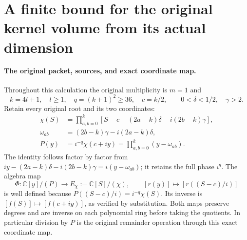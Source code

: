 \documentclass[11pt,a4paper]{article}
\begin{document}

\clearpage
\section{A finite bound for the original kernel volume from its actual dimension}
\label{sec:OKV}

\paragraph{The original packet, sources, and exact coordinate map.}
Throughout this calculation the original multiplicity is $m=1$ and
\[
 k=4l+1,\quad l\ge1,\quad q=(k+1)^2\ge36,\quad c=k/2,
 \qquad 0<\delta<1/2,\quad\gamma>2.
 \tag{OKV1}
\]
Retain every original root and its two coordinates:
\[
\begin{aligned}
 \chi(S)&=\prod_{a,b=0}^k
  [S-c-(2a-k)\delta-i(2b-k)\gamma],\\
 \omega_{ab}&=(2b-k)\gamma-i(2a-k)\delta,\\
 P(y)&=i^{-q}\chi(c+iy)=\prod_{a,b=0}^k(y-\omega_{ab}).
\end{aligned}
 \tag{OKV2}
\]
The identity follows factor by factor from
$iy-(2a-k)\delta-i(2b-k)\gamma=i(y-\omega_{ab})$;
it retains the full phase $i^q$. The algebra map
\[
 \Phi:\mathbb C[y]/(P)\longrightarrow E_\chi:=\mathbb C[S]/(\chi),
 \qquad [r(y)]\longmapsto[r((S-c)/i)]
 \tag{OKV3}
\]
is well defined because $P((S-c)/i)=i^{-q}\chi(S)$.
Its inverse is $[f(S)]\mapsto[f(c+iy)]$, as verified by substitution.
Both maps preserve degrees and are inverse on each polynomial ring
before taking the quotients. In particular division by $P$ is the
original remainder operation through this exact coordinate map.
\end{document}
